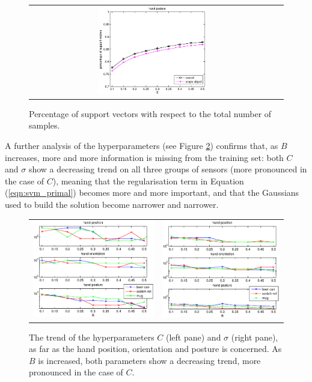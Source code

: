 \begin{figure}[htbp]
\begin{center}
\begin{tabular}{cc}
      \includegraphics[width=0.45\textwidth]{error_cmp_pst_SV.eps} \\
    \end{tabular}
    \caption{Percentage of support vectors with respect to the total
    number of samples.}
    \label{fig:hyperp}
  \end{center}
\end{figure}

A further analysis of the hyperparameters (see Figure
\ref{fig:C_trend}) confirms that, as $B$ increases, more and more
information is missing from the training set: both $C$ and $\sigma$
show a decreasing trend on all three groups of sensors (more
pronounced in the case of $C$), meaning that the regularisation term
in Equation (\ref{eqn:svm_primal}) becomes more and more important,
and that the Gaussians used to build the solution become narrower and
narrower.

\begin{figure}[htbp]
  \begin{center}
    \begin{tabular}{cc}
      \includegraphics[width=0.45\linewidth]{trend_C.eps} &
      \includegraphics[width=0.45\linewidth]{trend_sigma.eps}
    \end{tabular}
    \caption{The trend of the hyperparameters $C$ (left pane) and
    $\sigma$ (right pane), as far as the hand position, orientation
    and posture is concerned. As $B$ is increased, both parameters show a
    decreasing trend, more pronounced in the case of $C$.}
    \label{fig:C_trend}
  \end{center}
\end{figure}

